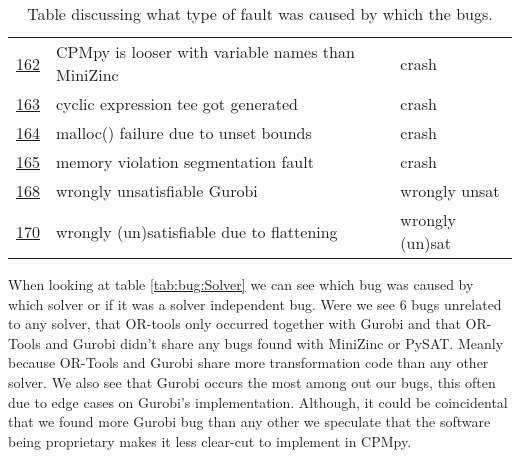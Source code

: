 \begin{table}[]
\begin{tabular}{lll}
		\href{https://github.com/CPMpy/cpmpy/issues/162}{162}   & CPMpy is looser with variable names than MiniZinc         & crash           \\
		\href{https://github.com/CPMpy/cpmpy/issues/163}{163}   & cyclic expression tee got generated                       & crash           \\
		\href{https://github.com/CPMpy/cpmpy/issues/164}{164}   & malloc() failure due to unset bounds                      & crash           \\
		\href{https://github.com/CPMpy/cpmpy/issues/165}{165}   & memory violation segmentation fault                       & crash           \\
		\href{https://github.com/CPMpy/cpmpy/issues/168}{168}   & wrongly unsatisfiable Gurobi                              & wrongly unsat   \\
		\href{https://github.com/CPMpy/cpmpy/issues/170}{170}   & wrongly (un)satisfiable due to flattening                 & wrongly (un)sat \\ \bottomrule
	\end{tabular}
	\caption{Table discussing what type of fault was caused by which the bugs.}
	\label{tab:bug:fault}
\end{table}

When looking at table \ref{tab:bug:Solver} we can see which bug was caused by which solver or if it was a solver independent bug. Were we see 6 bugs unrelated to any solver, that OR-tools only occurred together with Gurobi and that OR-Tools and Gurobi didn't share any bugs found with MiniZinc or PySAT. Meanly because OR-Tools and Gurobi share more transformation code than any other solver. We also see that Gurobi occurs the most among out our bugs, this often due to edge cases on Gurobi's implementation. Although, it could be coincidental that we found more Gurobi bug than any other we speculate that the software being proprietary makes it less clear-cut to implement in CPMpy.

